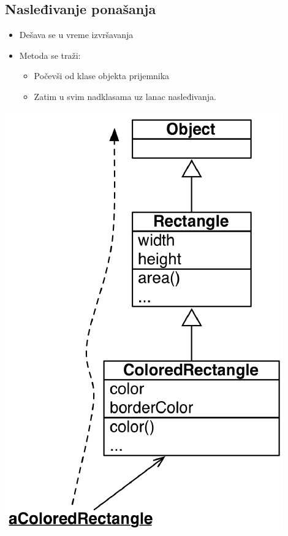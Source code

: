 \documentclass[presentation]{beamer}
\begin{document}
\subsection{Nasleđivanje ponašanja}
\label{sec:org27067e2}

\begin{itemize}
\item Dešava se u vreme izvršavanja
\item Metoda se traži:
\begin{itemize}
\item Počevši od klase objekta prijemnika
\item Zatim u svim nadklasama uz lanac nasleđivanja.
\end{itemize}
\end{itemize}
\begin{center}
\includegraphics[width=.9\linewidth]{./slike/method_lookup.png}
\end{center}
\end{document}
